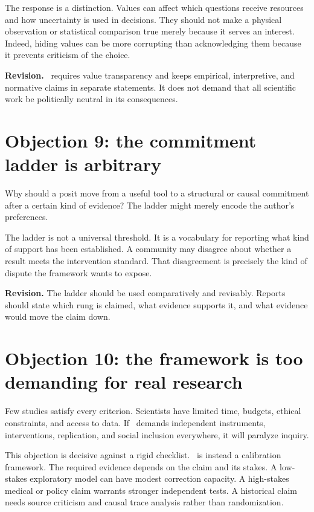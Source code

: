 The response is a distinction. Values can affect which questions receive
resources and how uncertainty is used in decisions. They should not make a
physical observation or statistical comparison true merely because it serves
an interest. Indeed, hiding values can be more corrupting than acknowledging
them because it prevents criticism of the choice.

\textbf{Revision.} \RCR\ requires value transparency and keeps empirical,
interpretive, and normative claims in separate statements. It does not demand
that all scientific work be politically neutral in its consequences.

\section{Objection 9: the commitment ladder is arbitrary}

Why should a posit move from a useful tool to a structural or causal commitment
after a certain kind of evidence? The ladder might merely encode the author's
preferences.

The ladder is not a universal threshold. It is a vocabulary for reporting what
kind of support has been established. A community may disagree about whether a
result meets the intervention standard. That disagreement is precisely the
kind of dispute the framework wants to expose.

\textbf{Revision.} The ladder should be used comparatively and revisably.
Reports should state which rung is claimed, what evidence supports it, and
what evidence would move the claim down.

\section{Objection 10: the framework is too demanding for real research}

Few studies satisfy every criterion. Scientists have limited time, budgets,
ethical constraints, and access to data. If \RCR\ demands independent
instruments, interventions, replication, and social inclusion everywhere, it
will paralyze inquiry.

This objection is decisive against a rigid checklist. \RCR\ is instead a
calibration framework. The required evidence depends on the claim and its
stakes. A low-stakes exploratory model can have modest correction capacity. A
high-stakes medical or policy claim warrants stronger independent tests. A
historical claim needs source criticism and causal trace analysis rather than
randomization.

